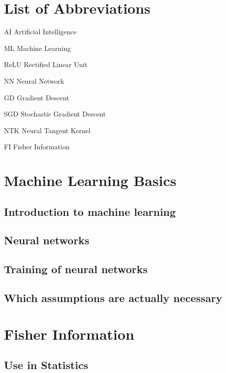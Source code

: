 \documentclass[12pt, a4paper]{report}
\begin{document}
	\chapter*{List of Abbreviations}
	\begin{abbreviations}
		\item[AI] Artificial Intelligence
		\item[ML] Machine Learning
		\item[ReLU] Rectified Linear Unit
		\item[NN] Neural Network
		\item[GD] Gradient Descent
		\item[SGD] Stochastic Gradient Descent
		\item[NTK] Neural Tangent Kernel
		\item[FI] Fisher Information
	\end{abbreviations}	
	
	\chapter{Machine Learning Basics}
	\section{Introduction to machine learning}\label{sec:MachineLearningIntroduction}
	
	\section{Neural networks}\label{sec:NeuralNetworks(BigSection)}
	
	\section{Training of neural networks}\label{sec:NeuralNetworkTraining}
	
	\section{Which assumptions are actually necessary}
	
	
	
	\chapter{Fisher Information}
	\section{Use in Statistics}
	
\end{document}
